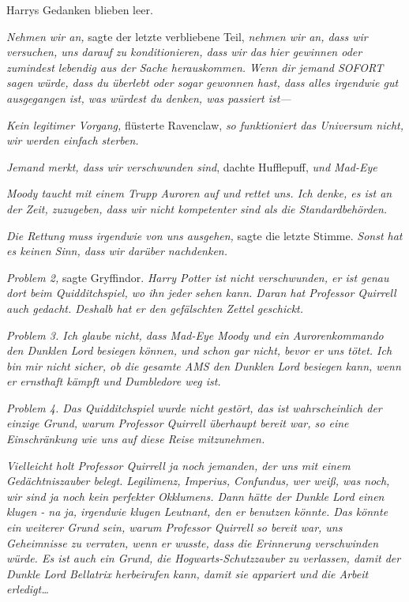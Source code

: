 {Harrys Gedanken blieben leer.

\emph{Nehmen wir an,} sagte der letzte verbliebene Teil, \emph{nehmen wir an, dass wir versuchen, uns darauf zu konditionieren, dass wir das hier gewinnen oder zumindest lebendig aus der Sache herauskommen. Wenn dir jemand SOFORT sagen würde, dass du überlebt oder sogar gewonnen hast, dass alles irgendwie gut ausgegangen ist, was würdest du denken, was passiert ist—}

\emph{Kein legitimer Vorgang,} flüsterte Ravenclaw, \emph{so funktioniert das Universum nicht, wir werden einfach sterben.}

\emph{\hfill\break Jemand merkt, dass wir verschwunden sind}, dachte Hufflepuff, \emph{und Mad-Eye}

\emph{Moody taucht mit einem Trupp Auroren auf und rettet uns. Ich denke, es ist an der Zeit, zuzugeben, dass wir nicht kompetenter sind als die Standardbehörden.}

\emph{Die Rettung muss irgendwie von uns ausgehen,} sagte die letzte Stimme. \emph{Sonst hat es keinen Sinn, dass wir darüber nachdenken.}

\emph{Problem 2,} sagte Gryffindor. \emph{Harry Potter ist nicht verschwunden, er ist genau dort beim Quidditchspiel, wo ihn jeder sehen kann. Daran hat Professor Quirrell auch gedacht. Deshalb hat er den gefälschten Zettel geschickt.}

\emph{Problem 3. Ich glaube nicht, dass Mad-Eye Moody und ein Aurorenkommando den Dunklen Lord besiegen können, und schon gar nicht, bevor er uns tötet. Ich bin mir nicht sicher, ob die gesamte AMS den Dunklen Lord besiegen kann, wenn er ernsthaft kämpft und Dumbledore weg ist.}

\emph{Problem 4. Das Quidditchspiel wurde nicht gestört, das ist wahrscheinlich der einzige Grund, warum Professor Quirrell überhaupt bereit war, so eine Einschränkung wie uns auf diese Reise mitzunehmen.}

\emph{Vielleicht holt Professor Quirrell ja noch jemanden, der uns mit einem Gedächtniszauber belegt. Legilimenz, Imperius, Confundus, wer weiß, was noch, wir sind ja noch kein perfekter Okklumens. Dann hätte der Dunkle Lord einen klugen - na ja, irgendwie klugen Leutnant, den er benutzen könnte. Das könnte ein weiterer Grund sein, warum Professor Quirrell so bereit war, uns Geheimnisse zu verraten, wenn er wusste, dass die Erinnerung verschwinden würde. Es ist auch ein Grund, die Hogwarts-Schutzzauber zu verlassen, damit der Dunkle Lord Bellatrix herbeirufen kann, damit sie appariert und die Arbeit erledigt…}

}
